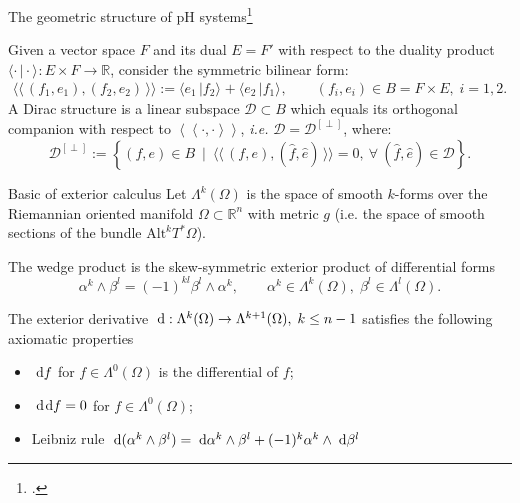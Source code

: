 \documentclass[aspectratio=169]{beamer}
\newcommand{\bbR}{\mathbb{R}}
\newcommand{\dualpr}[3][]{\ensuremath{\langle #2 \, \vert #3 \rangle_{#1}}}
\newcommand{\bilprod}[2]{\langle \langle \, #1, #2 \, \rangle \rangle}
\begin{document}
\begin{frame}{The geometric structure of pH systems\footcite{courant1990}}
	\begin{definition}
		Given a vector space ${F}$ and its dual ${E}=F'$ with respect to the duality product $\dualpr{\cdot}{\cdot} : {E} \times {F} \rightarrow \mathbb{R}$, consider the symmetric bilinear form:
		$$
		\bilprod{({f}_1, {e}_1)}{({f}_2, {e}_2)} := {\dualpr{{e}_1}{{f}_2}} + {\dualpr{{e}_2}{{f}_1}}, \qquad ({f}_i, {e}_i) \in {B} = {F} \times {E}, \; i = 1, 2.
		$$
		A Dirac structure is a linear subspace $\mathcal{D} \subset {B}$ which equals its orthogonal companion with respect to $\left\langle \left\langle \cdot, \cdot \right\rangle \right\rangle$, {\it i.e.} $\mathcal{D} =\mathcal{D}^{[\perp]}$, where:
		$$
		\mathcal{D}^{[\perp]} := \left\{ ({f}, {e}) \in {B} ~ \mid ~ \bilprod{({f}, {e})}{(\widehat{{f}}, \widehat{{e}})} = 0, ~ \forall ~ (\widehat{{f}}, \widehat{{e}}) \in \mathcal{D} \right\}.
		$$
	\end{definition}


\end{frame}



\begin{frame}{Basic of exterior calculus}
Let $\Lambda^k(\Omega)$ is the space of smooth $k$-forms over the Riemannian oriented manifold $\Omega \subset \bbR^n$ with metric $g$ (i.e. the space of smooth sections of the bundle $\mathrm{Alt}^k T^* \Omega$).

\begin{definition}
The wedge product is the skew-symmetric exterior product of differential forms
\begin{equation*}
	\alpha^k \wedge \beta^l = (-1)^{kl} \beta^l \wedge \alpha^k,
	\qquad \alpha^k \in \Lambda^k(\Omega), \; \beta^l \in \Lambda^l(\Omega).
\end{equation*}
\end{definition}

\begin{definition}
The exterior derivative $\d:\Lambda^k(\Omega) \rightarrow \Lambda^{k+1}(\Omega), \; k\le n-1$ satisfies the following axiomatic properties
\begin{itemize}
	\item $\d f$ for $f \in \Lambda^0(\Omega)$ is the differential of $f$;
	\item $\d{}\d{} f = 0$ for $f \in \Lambda^0(\Omega)$;
	\item Leibniz rule $\d (\alpha^k \wedge \beta^l) = \d\alpha^k \wedge \beta^l + (-1)^k \alpha^k \wedge \d\beta^l$
\end{itemize}
\end{definition}



\end{frame}
\end{document}

